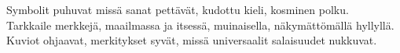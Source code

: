 \documentclass{article}
\begin{document}
\begin{infobox}
Symbolit puhuvat missä sanat pettävät, kudottu kieli, kosminen polku.\\
Tarkkaile merkkejä, maailmassa ja itsessä, muinaisella, näkymättömällä hyllyllä.\\
Kuviot ohjaavat, merkitykset syvät, missä universaalit salaisuudet nukkuvat.
\end{infobox}
\end{document}
